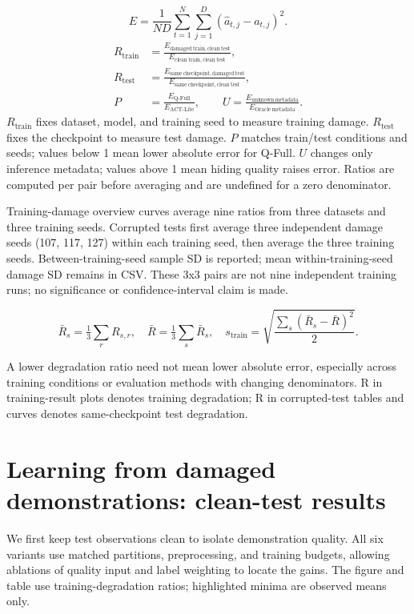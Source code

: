 \documentclass[11pt,a4paper]{article}
\newcommand{\note}[1]{\begin{tcolorbox}[colback=panel,colframe=rule,boxrule=0.5pt,arc=1mm]#1\end{tcolorbox}}
\begin{document}
\[E=\frac{1}{ND}\sum_{t=1}^{N}\sum_{j=1}^{D}(\hat a_{t,j}-a_{t,j})^2.\]
\begin{align*}
R_{\mathrm{train}}&=\frac{E_{\mathrm{damaged\ train,clean\ test}}}{E_{\mathrm{clean\ train,clean\ test}}},\\
R_{\mathrm{test}}&=\frac{E_{\mathrm{same\ checkpoint,damaged\ test}}}{E_{\mathrm{same\ checkpoint,clean\ test}}},\\
P&=\frac{E_{\mathrm{Q\text{-}Full}}}{E_{\mathrm{ACT\text{-}Lite}}},\qquad
U=\frac{E_{\mathrm{unknown\ metadata}}}{E_{\mathrm{Oracle\ metadata}}}.
\end{align*}
$R_{\mathrm{train}}$ fixes dataset, model, and training seed to measure training damage. $R_{\mathrm{test}}$ fixes the checkpoint to measure test damage. $P$ matches train/test conditions and seeds; values below 1 mean lower absolute error for Q-Full. $U$ changes only inference metadata; values above 1 mean hiding quality raises error. Ratios are computed per pair before averaging and are undefined for a zero denominator.

Training-damage overview curves average nine ratios from three datasets and three training seeds. Corrupted tests first average three independent damage seeds (107, 117, 127) within each training seed, then average the three training seeds. Between-training-seed sample SD is reported; mean within-training-seed damage SD remains in CSV. These 3x3 pairs are not nine independent training runs; no significance or confidence-interval claim is made.

\[\bar R_s=\tfrac13\sum_r R_{s,r},\quad \bar R=\tfrac13\sum_s\bar R_s,\quad s_{\mathrm{train}}=\sqrt{\frac{\sum_s(\bar R_s-\bar R)^2}{2}}.\]
\note{A lower degradation ratio need not mean lower absolute error, especially across training conditions or evaluation methods with changing denominators. R in training-result plots denotes training degradation; R in corrupted-test tables and curves denotes same-checkpoint test degradation.}
\clearpage\section{Learning from damaged demonstrations: clean-test results}
We first keep test observations clean to isolate demonstration quality. All six variants use matched partitions, preprocessing, and training budgets, allowing ablations of quality input and label weighting to locate the gains. The figure and table use training-degradation ratios; highlighted minima are observed means only.
\end{document}
